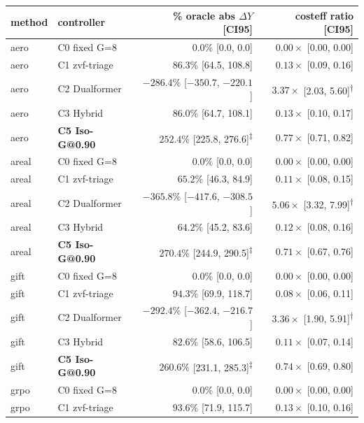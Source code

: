 \begin{table}[ht]
\centering
\small
\begin{tabular}{llrr}
\toprule
method & controller & \% oracle abs $\Delta Y$ [CI95] & costeff ratio [CI95] \\
\midrule
aero   & C0 fixed G=8       & $0.0\%$ [0.0, 0.0] & $0.00\times$ [0.00, 0.00] \\
aero   & C1 zvf-triage      & $86.3\%$ [64.5, 108.8] & $0.13\times$ [0.09, 0.16] \\
aero   & C2 Dualformer      & $-286.4\%$ [$-350.7$, $-220.1$] & $3.37\times$ [2.03, 5.60]\textsuperscript{$\dagger$} \\
aero   & C3 Hybrid          & $86.0\%$ [64.7, 108.1] & $0.13\times$ [0.10, 0.17] \\
aero   & \textbf{C5 Iso-G@0.90} & $\mathbf{252.4\%}$ [225.8, 276.6]\textsuperscript{$\ddagger$} & $\mathbf{0.77\times}$ [0.71, 0.82] \\
\midrule
areal  & C0 fixed G=8       & $0.0\%$ [0.0, 0.0] & $0.00\times$ [0.00, 0.00] \\
areal  & C1 zvf-triage      & $65.2\%$ [46.3, 84.9] & $0.11\times$ [0.08, 0.15] \\
areal  & C2 Dualformer      & $-365.8\%$ [$-417.6$, $-308.5$] & $5.06\times$ [3.32, 7.99]\textsuperscript{$\dagger$} \\
areal  & C3 Hybrid          & $64.2\%$ [45.2, 83.6] & $0.12\times$ [0.08, 0.16] \\
areal  & \textbf{C5 Iso-G@0.90} & $\mathbf{270.4\%}$ [244.9, 290.5]\textsuperscript{$\ddagger$} & $\mathbf{0.71\times}$ [0.67, 0.76] \\
\midrule
gift   & C0 fixed G=8       & $0.0\%$ [0.0, 0.0] & $0.00\times$ [0.00, 0.00] \\
gift   & C1 zvf-triage      & $94.3\%$ [69.9, 118.7] & $0.08\times$ [0.06, 0.11] \\
gift   & C2 Dualformer      & $-292.4\%$ [$-362.4$, $-216.7$] & $3.36\times$ [1.90, 5.91]\textsuperscript{$\dagger$} \\
gift   & C3 Hybrid          & $82.6\%$ [58.6, 106.5] & $0.11\times$ [0.07, 0.14] \\
gift   & \textbf{C5 Iso-G@0.90} & $\mathbf{260.6\%}$ [231.1, 285.3]\textsuperscript{$\ddagger$} & $\mathbf{0.74\times}$ [0.69, 0.80] \\
\midrule
grpo   & C0 fixed G=8       & $0.0\%$ [0.0, 0.0] & $0.00\times$ [0.00, 0.00] \\
grpo   & C1 zvf-triage      & $93.6\%$ [71.9, 115.7] & $0.13\times$ [0.10, 0.16] \\

\end{tabular}
\end{table}
